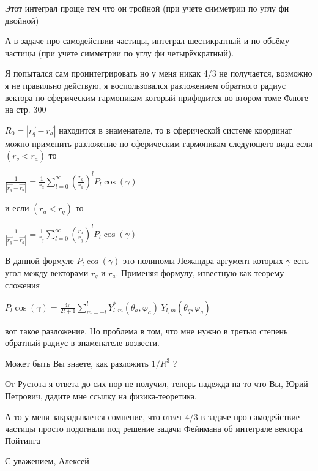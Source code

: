 \documentclass{article}
\begin{document}
Этот интеграл проще тем что он тройной (при учете симметрии по углу фи двойной)

А в задаче про самодействии частицы, интеграл шестикратный и по объёму частицы  (при учете симметрии по углу фи четырёхкратный).

Я попытался сам проинтегрировать но у меня никак 4/3 не получается, возможно я не правильно действую, я воспользовался разложением обратного радиус вектора по сферическим гармоникам который прифодится во втором томе Флюге на стр. 300

${{R}_{0}}=\left|\overrightarrow{r_{q}} - \overrightarrow{r_{a}}\right|$ находится в знаменателе, то в сферической системе координат можно применить разложение по сферическим гармоникам следующего вида  \cite{flugge} если $\left( {{r}_{q}}<{{r}_{a}} \right)$ то

$\frac{1}{\left| \overrightarrow{{{r}_{q}}}-\overrightarrow{{{r}_{a}}} \right|}=\frac{1}{{{r}_{a}}}\sum\limits_{l=0}^{\infty }{{{\left( \frac{{{r}_{q}}}{{{r}_{a}}} \right)}^{l}}{{P}_{l}} \cos \left( \gamma  \right)}$

и если $\left( {{r}_{a}}<{{r}_{q}} \right)$ то

$\frac{1}{\left| \overrightarrow{{{r}_{q}}}-\overrightarrow{{{r}_{a}}} \right|}=\frac{1}{{{r}_{q}}}\sum\limits_{l=0}^{\infty }{{{\left( \frac{{{r}_{a}}}{{{r}_{q}}} \right)}^{l}}{{P}_{l}} \cos \left( \gamma  \right)}$

В данной формуле ${{P}_{l}} \cos \left( \gamma  \right)$ это полиномы Лежандра аргумент которых $\gamma$ есть угол между векторами ${{r}_{q}}$  и ${{r}_{a}}$. Применяя формулу, известную как теорему сложения

${{P}_{l}}\cos \left( \gamma  \right)=\frac{4\pi }{2l+1}\sum\limits_{m=-l}^{l}{Y_{l,m}^{*}\left( {{\theta }_{a}},{{\varphi }_{a}} \right)}\ {{Y}_{l,m}}\left( {{\theta }_{q}},{{\varphi }_{q}} \right)$


вот такое разложение. Но проблема в том, что мне нужно в третью степень обратный радиус в знаменателе возвести.

Может быть Вы знаете, как разложить $1/R^3$
?

От Рустота я ответа до сих пор не получил, теперь надежда на то что Вы, Юрий Петрович, дадите мне ссылку на физика-теоретика. 

А то у меня закрадывается сомнение, что ответ 4/3 в задаче про самодействие частицы просто подогнали под решение задачи Фейнмана об интеграле вектора Пойтинга

С уважением, Алексей
\end{document}
